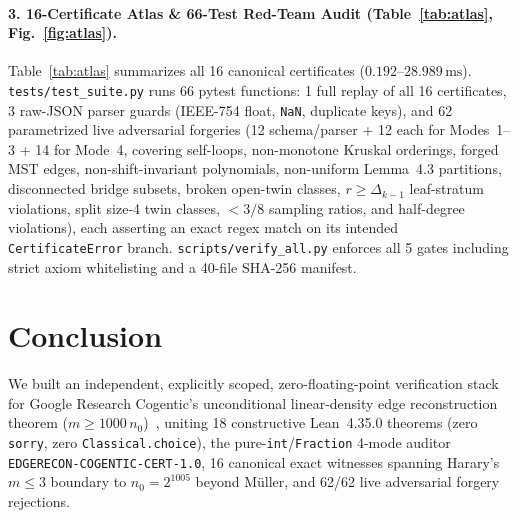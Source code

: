\documentclass[10pt,twocolumn]{article}
\begin{document}
\paragraph{3. 16-Certificate Atlas \& 66-Test Red-Team Audit (Table~\ref{tab:atlas}, Fig.~\ref{fig:atlas}).}
Table~\ref{tab:atlas} summarizes all 16 canonical certificates ($0.192$--$28.989\,\mathrm{ms}$). \texttt{tests/test\_\allowbreak suite.py} runs 66 pytest functions: 1 full replay of all 16 certificates, 3 raw-JSON parser guards (IEEE-754 float, \texttt{NaN}, duplicate keys), and 62 parametrized live adversarial forgeries (12 schema/parser + 12 each for Modes~1--3 + 14 for Mode~4, covering self-loops, non-monotone Kruskal orderings, forged MST edges, non-shift-invariant polynomials, non-uniform Lemma~4.3 partitions, disconnected bridge subsets, broken open-twin classes, $r\ge\Delta_{k-1}$ leaf-stratum violations, split size-4 twin classes, $<3/8$ sampling ratios, and half-degree violations), each asserting an exact regex match on its intended \texttt{CertificateError} branch. \texttt{scripts/verify\_\allowbreak all.py} enforces all 5 gates including strict axiom whitelisting and a 40-file SHA-256 manifest.

\section{Conclusion}\label{sec:conc}
We built an independent, explicitly scoped, zero-floating-point verification stack for Google Research Cogentic's unconditional linear-density edge reconstruction theorem ($m\ge 1000\,n_0$)~\cite{cogentic2026edgerecon}, uniting 18 constructive Lean~4.35.0 theorems (zero \texttt{sorry}, zero \texttt{Classical.choice}), the pure-\texttt{int}/\texttt{Fraction} 4-mode auditor \texttt{EDGERECON-COGENTIC-CERT-1.0}, 16 canonical exact witnesses spanning Harary's $m\le 3$ boundary to $n_0=2^{1005}$ beyond M\"uller, and 62/62 live adversarial forgery rejections.

{\footnotesize

}
\end{document}
